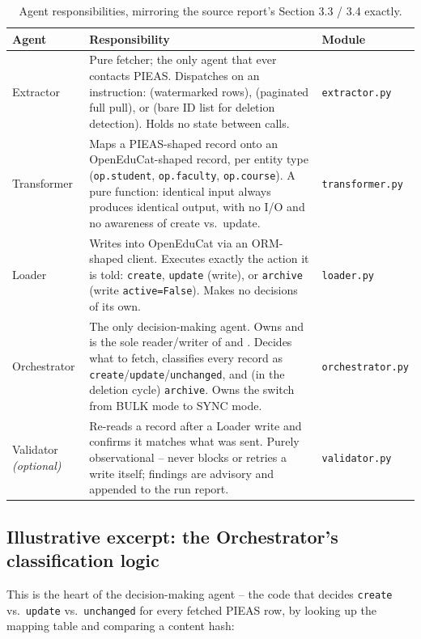 \documentclass[11pt,a4paper]{article}
\newcommand{\ttu}[1]{\texttt{\detokenize{#1}}}
\begin{document}
\begin{table}[H]
\centering
\small
\begin{tabular}{@{}p{2.3cm}p{9.0cm}p{2.9cm}@{}}
\toprule
\textbf{Agent} & \textbf{Responsibility} & \textbf{Module} \\
\midrule
Extractor & Pure fetcher; the only agent that ever contacts PIEAS. Dispatches on an
instruction: \ttu{fetch_changed} (watermarked rows), \ttu{fetch_page} (paginated full pull),
or \ttu{fetch_ids} (bare ID list for deletion detection). Holds no state between calls. &
\texttt{extractor.py} \\[0.4em]
Transformer & Maps a PIEAS-shaped record onto an OpenEduCat-shaped record, per entity type
(\texttt{op.student}, \texttt{op.faculty}, \texttt{op.course}). A pure function: identical
input always produces identical output, with no I/O and no awareness of create vs.\ update. &
\texttt{transformer.py} \\[0.4em]
Loader & Writes into OpenEduCat via an ORM-shaped client. Executes exactly the action it is
told: \texttt{create}, \texttt{update} (write), or \texttt{archive} (write \texttt{active=False}).
Makes no decisions of its own. & \texttt{loader.py} \\[0.4em]
Orchestrator & The only decision-making agent. Owns and is the sole reader/writer of
\ttu{sync_mapping} and \ttu{sync_state}. Decides what to fetch, classifies every record as
\texttt{create}/\texttt{update}/\texttt{unchanged}, and (in the deletion cycle)
\texttt{archive}. Owns the switch from BULK mode to SYNC mode. & \texttt{orchestrator.py} \\[0.4em]
Validator \textit{(optional)} & Re-reads a record after a Loader write and confirms it matches
what was sent. Purely observational -- never blocks or retries a write itself; findings are
advisory and appended to the run report. & \texttt{validator.py} \\
\bottomrule
\end{tabular}
\caption{Agent responsibilities, mirroring the source report's Section 3.3 / 3.4 exactly.}
\end{table}

\subsection{Illustrative excerpt: the Orchestrator's classification logic}

This is the heart of the decision-making agent -- the code that decides \texttt{create} vs.\
\texttt{update} vs.\ \texttt{unchanged} for every fetched PIEAS row, by looking up the mapping
table and comparing a content hash:
\end{document}
